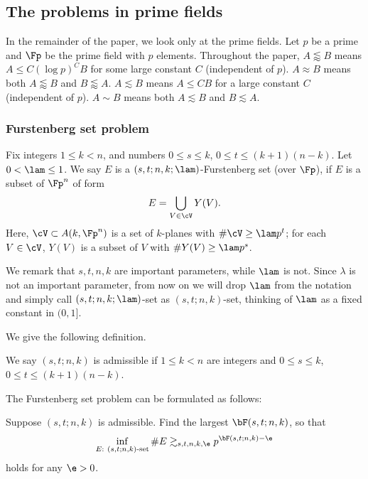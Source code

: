 \subsection{The problems in prime fields}
In the remainder of the paper, we look only at the prime fields. Let $p$ be a prime and $\Fp$ be the prime field with $p$ elements. Throughout the paper, $A\lessapprox B$ means $A\le  C (\log p)^{C} B$ for some large constant $C$ (independent of $p$). $A\approx B$ means both $A\lessapprox B$ and $B\lessapprox A$.  $A\lesssim B$ means $A\le C B$ for a large constant $C$ (independent of $p$). $A\sim B$ means both $A\lesssim B$ and $B\lesssim A$. 

\subsubsection{Furstenberg set problem}

\begin{definition}[$(s,t;n,k)$-set]
    Fix integers $1\le k<n$, and numbers $0\le s\le k$, $0\le t\le (k+1)(n-k)$. Let $0<\lam\le 1$. We say $E$ is a $(s,t;n,k;\lam)$-Furstenberg set (over $\Fp$), if $E$ is a subset of $\Fp^n$ of form
    \[ E=\bigcup_{V\in\cV}Y(V). \]
    Here, $\cV\subset A(k,\Fp^n)$ is a set of $k$-planes with $\#\cV\ge \lam p^t$; for each $V\in\cV$, $Y(V)$ is a subset of $V$ with $\#Y(V)\ge \lam p^s$. 
\end{definition}

\begin{remark}
   {\rm We remark that $s,t,n,k$ are important parameters, while $\lam$ is not.
   Since $\lambda$ is not an important parameter, from now on we will drop $\lam$ from the notation and simply call $(s,t;n,k;\lam)$-set as $(s,t;n,k)$-set, thinking of $\lam$ as a fixed constant in $(0,1]$. 
   }
\end{remark}

We give the following definition.
\begin{definition}
    We say $(s,t;n,k)$ is admissible if $1\le k<n$ are integers and $0\le s\le k$, $0\le t\le (k+1)(n-k)$.
\end{definition}

The Furstenberg set problem can be formulated as follows:

\begin{question}
Suppose $(s,t;n,k)$ is admissible.
Find the largest $\bF(s,t;n,k)$, so that 
\begin{equation}\label{deff}
    \inf_{E:\ (s,t;n,k)\textup{-set}} \#E\gtrsim_{s,t,n,k,\e} p^{\bF(s,t;n,k)-\e} 
\end{equation}
holds for any $\e>0$.
\end{question}


